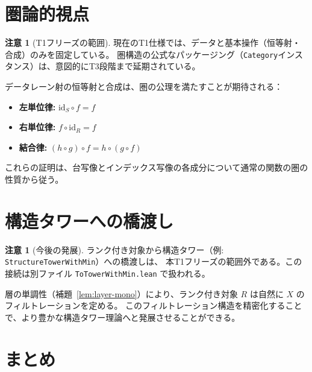 \documentclass[a4paper,12pt]{ltjsarticle}
\theoremstyle{definition}
\newtheorem{remark}[definition]{注意}
\begin{document}
\section{圏論的視点}

\begin{remark}[T1フリーズの範囲]
現在のT1仕様では、データと基本操作（恒等射・合成）のみを固定している。
圏構造の公式なパッケージング（\texttt{Category}インスタンス）は、意図的にT3段階まで延期されている。
\end{remark}

データレーン射の恒等射と合成は、圏の公理を満たすことが期待される：
\begin{itemize}
\item \textbf{左単位律:} $\mathrm{id}_S \circ f = f$
\item \textbf{右単位律:} $f \circ \mathrm{id}_R = f$
\item \textbf{結合律:} $(h \circ g) \circ f = h \circ (g \circ f)$
\end{itemize}

これらの証明は、台写像とインデックス写像の各成分について通常の関数の圏の性質から従う。

\begin{center}
\end{center}

\section{構造タワーへの橋渡し}

\begin{remark}[今後の発展]
ランク付き対象から構造タワー（例: \texttt{StructureTowerWithMin}）への橋渡しは、
本T1フリーズの範囲外である。この接続は別ファイル \texttt{ToTowerWithMin.lean} で扱われる。
\end{remark}

層の単調性（補題~\ref{lem:layer-mono}）により、ランク付き対象 $R$ は自然に $X$ のフィルトレーションを定める。
このフィルトレーション構造を精密化することで、より豊かな構造タワー理論へと発展させることができる。

\section{まとめ}
\end{document}
